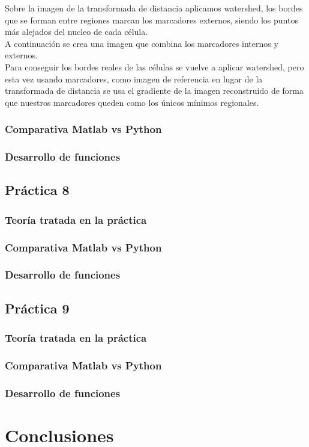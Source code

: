 \documentclass[a4paper,12pt]{report}
\begin{document}
Sobre la imagen de la transformada de distancia aplicamos watershed, los bordes que se forman entre regiones marcan los marcadores externos, siendo los puntos más alejados del nucleo de cada célula.\\

A continuación se crea una imagen que combina los marcadores internos y externos. \\

Para conseguir los bordes reales de las células se vuelve a aplicar watershed, pero esta vez usando marcadores, como imagen de referencia en lugar de la transformada de distancia se usa el gradiente de la imagen reconstruido de forma que nuestros marcadores queden como los únicos mínimos regionales.\\


\subsection{Comparativa Matlab vs Python}
\subsection{Desarrollo de funciones}

\section{ Práctica 8}
\subsection{Teoría tratada en la práctica}
\subsection{Comparativa Matlab vs Python}
\subsection{Desarrollo de funciones}

\section{ Práctica 9}
\subsection{Teoría tratada en la práctica}
\subsection{Comparativa Matlab vs Python}
\subsection{Desarrollo de funciones}


\chapter{Conclusiones}

\nocite{*}
\printbibliography[heading=bibintoc,title={Bibliography}]
\end{document}
